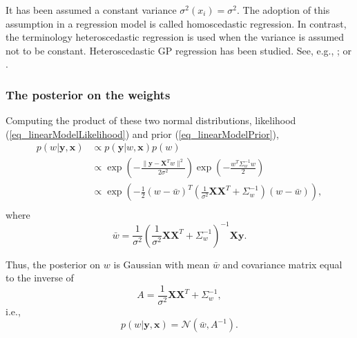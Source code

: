 \begin{remark}
It has been assumed a constant variance $\sigma^2(x_i) = \sigma^2$. 
The adoption of this assumption in a regression model is called homoscedastic regression. 
In contrast, the terminology heteroscedastic regression is used when the variance is assumed not to be constant. 
Heteroscedastic GP regression has been studied. See, e.g., \textcite{antunes2017}; or \textcite{lazaro-gredilla2011}.
\end{remark}

\subsubsection{The posterior on the weights}

Computing the product of these two normal distributions, likelihood (\ref{eq_linearModelLikelihood}) and prior (\ref{eq_linearModelPrior}),
\begin{equation*}
  \begin{aligned}
    p(w | \pmb{y}, \pmb{x}) &\propto p(\pmb{y}|w,\pmb{x}) p(w) \\
          &\propto \exp\left( -\frac{\| \pmb{y} -  \pmb{X}^Tw \|^2}{2\sigma^2} \right) \exp\left( -\frac{w^T\Sigma_w^{-1}w}{2} \right) \\
          &\propto \exp\left( 
                 -\frac{1}{2} 
                 (w-\bar{w})^T 
                 \left( \frac{1}{\sigma^2}\pmb{X}\pmb{X}^T + \Sigma_w^{-1} \right)
                 (w-\bar{w}) 
                 \right), \\
  \end{aligned}
\end{equation*}
where
\begin{equation*}
  \bar{w} = \frac{1}{\sigma^2} \left( \frac{1}{\sigma^2}\pmb{X}\pmb{X}^T + \Sigma_w^{-1} \right)^{-1} \pmb{X}\pmb{y}.
\end{equation*}

Thus, the posterior on $w$ is Gaussian with mean $\bar{w}$ and covariance matrix equal to the inverse of
\begin{equation*} \label{eq_matrixA}
  A = \frac{1}{\sigma^2}\pmb{X}\pmb{X}^T + \Sigma_w^{-1},
\end{equation*}
i.e.,
\begin{equation} \label{eq_posteriorLinearModel}
  p(w | \pmb{y}, \pmb{x}) = \mathcal{N}(\bar{w},A^{-1}).
\end{equation}

